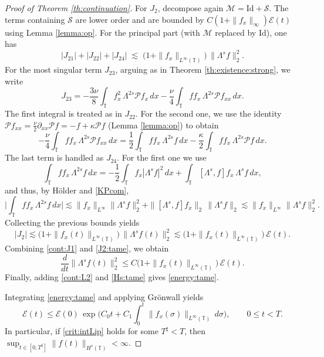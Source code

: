 \documentclass[reqno]{amsart}
\newcommand{\TT}{\mathbb T}
\newcommand{\Id}{\mathrm{Id}}
\theoremstyle{definition}
\numberwithin{equation}{section}
\numberwithin{theorem}{section}
\numberwithin{definition}{section}
\begin{document}
\begin{proof}[Proof of Theorem \ref{th:continuation}]
For $J_2$, decompose again $\mathcal{M}=\Id+\mathcal{S}$. The terms containing $\mathcal{S}$ are lower order and
are bounded by $C(1+\|f_x\|_\infty)\mathcal{E}(t)$ using Lemma \ref{lemma:op}. For the principal part (with
$\mathcal{M}$ replaced by $\Id$), one has
\begin{equation}\label{J21J22J24:tame}
|J_{21}|+|J_{22}|+|J_{24}|\;\lesssim\;\Big(1+\|f_x\|_{L^\infty(\TT)}\Big)\,\|\Lambda^s f\|_2^2.
\end{equation}
For the most singular term $J_{23}$, arguing as in Theorem \ref{th:existence:strong}, we write
\[
J_{23}=-\frac{3\nu}{8}\int_{\TT} f_{x}^{2}\,\Lambda^{2s}\mathcal{P}f_{x}\,dx
-\frac{\nu}{4}\int_{\TT} ff_{x}\,\Lambda^{2s}\mathcal{P}f_{xx}\,dx.
\]
The first integral is treated as in $J_{22}$. For the second one, we use the identity
$\mathcal{P}f_{xx}=\frac{\nu}{2}\partial_{xx}\mathcal{P}f=-f+\kappa \mathcal{P}f$ (Lemma \ref{lemma:op}) to obtain
\[
-\frac{\nu}{4}\int_{\TT} ff_x\,\Lambda^{2s}\mathcal{P}f_{xx}\,dx
= \frac12\int_{\TT} ff_x\,\Lambda^{2s}f\,dx
-\frac{\kappa}{2}\int_{\TT} ff_x\,\Lambda^{2s}\mathcal{P}f\,dx.
\]
The last term is handled as $J_{24}$. For the first one we use
\[
\int_{\TT} ff_x\,\Lambda^{2s}f\,dx
=-\frac12\int_{\TT} f_x|\Lambda^s f|^2\,dx
+\int_{\TT} [\Lambda^s,f]f_x\,\Lambda^s f\,dx,
\]
and thus, by Hölder and \eqref{KPcom},
\[
\Big|\int_{\TT} ff_x\,\Lambda^{2s}f\,dx\Big|
\lesssim \|f_x\|_{L^\infty}\|\Lambda^s f\|_2^2
+\|[\Lambda^s,f]f_x\|_2\,\|\Lambda^s f\|_2
\lesssim \|f_x\|_{L^\infty}\|\Lambda^s f\|_2^2.
\]
Collecting the previous bounds yields
\begin{equation}\label{J2:tame}
|J_2|\lesssim \Big(1+\|f_x(t)\|_{L^\infty(\TT)}\Big)\,\|\Lambda^s f(t)\|_2^2
\lesssim \Big(1+\|f_x(t)\|_{L^\infty(\TT)}\Big)\,\mathcal{E}(t).
\end{equation}
Combining \eqref{cont:J1} and \eqref{J2:tame}, we obtain
\begin{equation}\label{Hs:tame}
\frac{d}{dt}\|\Lambda^s f(t)\|_2^2
\le C\Big(1+\|f_x(t)\|_{L^\infty(\TT)}\Big)\,\mathcal{E}(t).
\end{equation}
Finally, adding \eqref{cont:L2} and \eqref{Hs:tame} gives \eqref{energy:tame}.

\medskip
Integrating \eqref{energy:tame} and applying Grönwall yields
\begin{equation}\label{gronwall:tame}
	\mathcal{E}(t)\le \mathcal{E}(0)\,
	\exp\!\Big(C_0 t + C_1\int_0^{t}\|f_x(\sigma)\|_{L^\infty(\TT)}\,d\sigma\Big),
	\qquad 0\le t<T.
\end{equation}
In particular, if \eqref{crit:intLip} holds for some $T^\sharp<T$, then
$\sup_{t\in[0,T^\sharp]}\|f(t)\|_{H^s(\TT)}<\infty$.


\end{proof}
\end{document}
